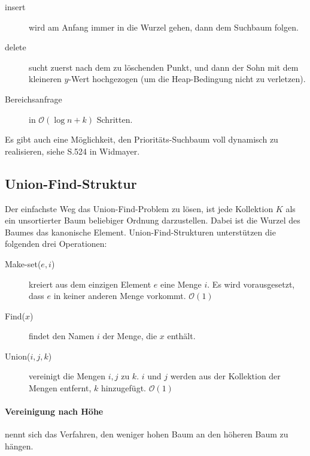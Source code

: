 \documentclass[a4paper, 9pt, DIV=20]{scrartcl}
\newcommand{\Oh}{\mathcal{O}}
\begin{document}
\begin{description}
\item[insert] wird am Anfang immer in die Wurzel gehen, dann dem Suchbaum folgen.
\item[delete] sucht zuerst nach dem zu löschenden Punkt, und dann der Sohn mit dem kleineren $y$-Wert hochgezogen (um die Heap-Bedingung nicht zu verletzen).
\item[Bereichsanfrage] in $\Oh(\log{n}+k)$ Schritten.
\end{description}

Es gibt auch eine Möglichkeit, den Prioritäts-Suchbaum voll dynamisch zu realisieren, siehe S.524 in Widmayer.

\subsection{Union-Find-Struktur}
Der einfachste Weg das Union-Find-Problem zu lösen, ist jede Kollektion $K$ als ein unsortierter Baum beliebiger Ordnung darzustellen. Dabei ist die Wurzel des Baumes das kanonische Element. Union-Find-Strukturen unterstützen die folgenden drei Operationen:
\begin{description}
\item[Make-set($e,i$)] kreiert aus dem einzigen Element $e$ eine Menge $i$. Es wird vorausgesetzt, dass $e$ in keiner anderen Menge vorkommt. $\Oh(1)$
\item[Find($x$)] findet den Namen $i$ der Menge, die $x$ enthält.
\item[Union($i,j,k$)]  vereinigt die Mengen $i, j$ zu $k$. $i$ und $j$ werden aus der Kollektion der Mengen entfernt, $k$ hinzugefügt. $\Oh(1)$
\end{description}

\paragraph{Vereinigung nach Höhe} nennt sich das Verfahren, den weniger hohen Baum an den höheren Baum zu hängen.
\end{document}

